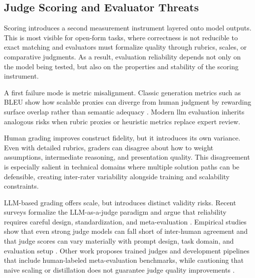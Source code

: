 
\subsection{Judge Scoring and Evaluator Threats}
\label{subsec:ch2_scoring_threats}



Scoring introduces a second measurement instrument layered onto model outputs. This is most visible for open-form tasks, where correctness is not reducible to exact matching and evaluators must formalize quality through rubrics, scales, or comparative judgments. As a result, evaluation reliability depends not only on the model being tested, but also on the properties and stability of the scoring instrument.

A first failure mode is metric misalignment. Classic generation metrics such as BLEU show how scalable proxies can diverge from human judgment by rewarding surface overlap rather than semantic adequacy \cite{papineniBleuMethodAutomatic2002}. Modern \ac{llm} evaluation inherits analogous risks when rubric proxies or heuristic metrics replace expert review.

Human grading improves construct fidelity, but it introduces its own variance. Even with detailed rubrics, graders can disagree about how to weight assumptions, intermediate reasoning, and presentation quality. This disagreement is especially salient in technical domains where multiple solution paths can be defensible, creating inter-rater variability alongside training and scalability constraints.

LLM-based grading offers scale, but introduces distinct validity risks. Recent surveys formalize the LLM-as-a-judge paradigm and argue that reliability requires careful design, standardization, and meta-evaluation \cite{gu_survey_on_llm_as_a_judge_2025, li_llms_as_judges_2024}. Empirical studies show that even strong judge models can fall short of inter-human agreement and that judge scores can vary materially with prompt design, task domain, and evaluation setup \cite{thakurJudgingJudgesEvaluating2025, huang_EmpiricalStudyLLMasaJudgeLLM_2025}. Other work proposes trained judges and development pipelines that include human-labeled meta-evaluation benchmarks, while cautioning that naive scaling or distillation does not guarantee judge quality improvements \cite{huTrainingLLMasaJudgeModel2025}.

